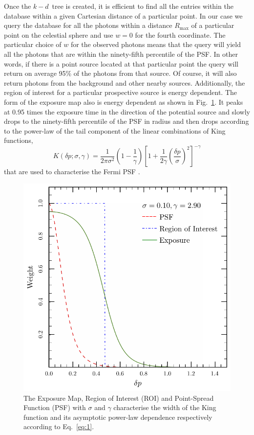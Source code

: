 \documentclass[useAMS,usenatbib]{mn2e}
\begin{document}
Once the $k-d$~tree is created, it is efficient to find all the
entries within the database within a given Cartesian distance of a
particular point.  In our case we query the database for all the
photons within a distance $R_\mathrm{max}$ of a particular point on
the celestial sphere and use $w=0$ for the fourth coordinate.  The
particular choice of $w$ for the observed photons means that the query
will yield all the photons that are within the ninety-fifth
percentile of the PSF.  In other words, if there is a point source
located at that particular point the query will return on average 95\%
of the photons from that source.  Of course, it will also return
photons from the background and other nearby sources.  Additionally,
the region of interest for a particular prospective source is energy
dependent.  The form of the exposure map also is energy dependent as
shown in Fig.~\ref{fig:expmap}.  It peaks at 0.95 times the exposure
time in the direction of the potential source and slowly drops to the
ninety-fifth percentile of the PSF in radius and then drops according
to the power-law of the tail component of the linear combinations of
King functions,
\begin{equation}
  K(\delta p; \sigma, \gamma) =\frac{1}{2\pi \sigma^2} \left ( 1- \frac{1}{\gamma} \right ) \left [ 1 + \frac{1}{2\gamma} \left (\frac{\delta p}{\sigma} \right )^2 \right ]^{-\gamma}
\label{eq:1}
\end{equation}
that are used to characterise the Fermi PSF \citep{2013ApJ...765...54A}.  
\begin{figure}
\includegraphics[width=\columnwidth]{expmap2}
\caption{The Exposure Map, Region of Interest (ROI)
  and Point-Spread Function (PSF) with $\sigma$ and $\gamma$ characterise
  the width of the King function and its asymptotic power-law dependence respectively
  according to Eq.~\ref{eq:1}.
}
\label{fig:expmap}
\end{figure}
\end{document}
